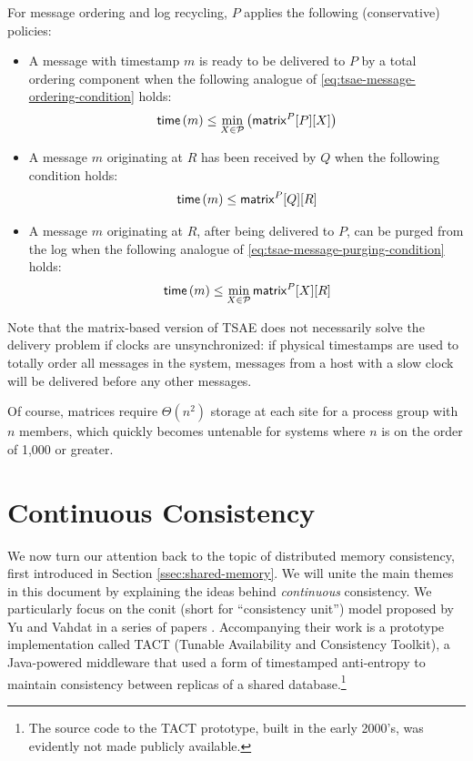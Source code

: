 \documentclass[]             %
{NASA}                       %
\theoremstyle{definition}
\begin{document}
For message ordering and log recycling, $P$ applies the following
(conservative) policies:
\begin{itemize}
\item A message with timestamp $m$ is ready to be delivered to $P$ by a total
  ordering component when the following analogue of \eqref{eq:tsae-message-ordering-condition} holds:
  \begin{equation}
    \mathsf{time}\left(m\right) \leq \min_{X \in \mathcal{P}} \left(\mathsf{matrix}^{P}[P][X]\right)
  \end{equation}
\item A message $m$ originating at $R$ has been
  received by $Q$ when the following condition holds:
  \begin{equation}
    \mathsf{time}\left(m\right) \leq \mathsf{matrix}^{P}[Q][R]
  \end{equation}
\item A message $m$ originating at $R$, after being delivered to $P$,
  can be purged from the log when the following analogue of
  \eqref{eq:tsae-message-purging-condition} holds:
  \begin{equation}
    \mathsf{time}\left(m\right) \leq \min_{X \in \mathcal{P}}\mathsf{matrix}^{P}[X][R]
  \end{equation}
\end{itemize}
Note that the matrix-based version of TSAE does not necessarily solve
the delivery problem if clocks are unsynchronized: if physical
timestamps are used to totally order all messages in the system,
messages from a host with a slow clock will be delivered before any
other messages.

Of course, matrices require $\Theta(n^2)$ storage at each site for a
process group with $n$ members, which quickly becomes untenable for
systems where $n$ is on the order of 1,000 or greater.

\section{Continuous Consistency}
\label{sec:continuous-consistency}
We now turn our attention back to the topic of distributed memory
consistency, first introduced in Section \ref{ssec:shared-memory}. We
will unite the main themes in this document by explaining the ideas
behind \emph{continuous} consistency. We particularly focus on the
conit (short for ``consistency unit'') model proposed by Yu and Vahdat
in a series of papers
\cite{2000tact,2000tactalgorithms,10.5555/1251229.1251250,DBLP:conf/icdcs/YuV01,2002tact}.
Accompanying their work is a prototype implementation called TACT
(Tunable Availability and Consistency Toolkit), a Java-powered
middleware that used a form of timestamped anti-entropy to maintain
consistency between replicas of a shared database.\footnote{The source
  code to the TACT prototype, built in the early 2000's, was evidently
  not made publicly available.}
\end{document}

